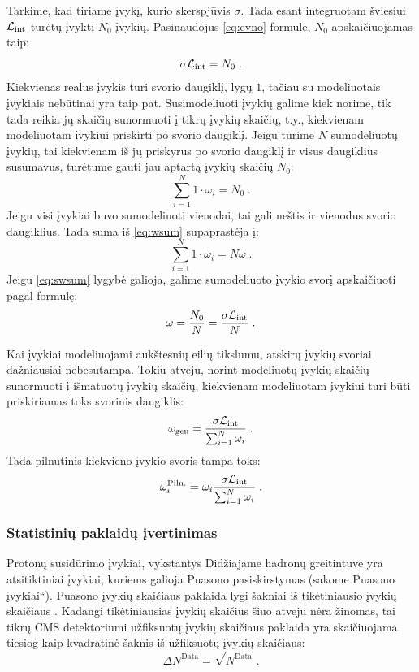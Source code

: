 \documentclass[a4paper, 12pt]{article}
\newcommand{\ltq}[1]{{\quotedblbase{}#1\textquotedblleft{}}}
\newcommand{\Lumi}{{\cal L}_\mathrm{int}}
\newlength\q
\begin{document}
Tarkime, kad tiriame įvykį, kurio skerspjūvis $\sigma$. Tada esant integruotam šviesiui $\Lumi$ turėtų įvykti $N_{0}$ įvykių. Pasinaudojus \eqref{eq:evno} formule, $N_{0}$ apskaičiuojamas taip:
\begin{equation}
\sigma \Lumi=N_{0} \; .
\label{eq:ilumi}
\end{equation}
Kiekvienas realus įvykis turi svorio daugiklį, lygų $1$, tačiau su modeliuotais įvykiais nebūtinai yra taip pat. Susimodeliuoti įvykių galime kiek norime, tik tada reikia jų skaičių sunormuoti į tikrų įvykių skaičių, t.y., kiekvienam modeliuotam įvykiui priskirti po svorio daugiklį. Jeigu turime $N$ sumodeliuotų įvykių, tai kiekvienam iš jų priskyrus po svorio daugiklį ir visus daugiklius susumavus, turėtume gauti jau aptartą įvykių skaičių $N_{0}$:
\begin{equation}
\sum_{i=1}^{N}1\cdot \omega_{i}=N_{0} \; .
\label{eq:wsum}
\end{equation}
Jeigu visi įvykiai buvo sumodeliuoti vienodai, tai gali neštis ir vienodus svorio daugiklius. Tada suma iš \eqref{eq:wsum} supaprastėja į:
\begin{equation}
\sum_{i=1}^{N}1\cdot \omega_{i}=N\omega \; .
\label{eq:swsum}
\end{equation}
Jeigu \eqref{eq:swsum} lygybė galioja, galime sumodeliuoto įvykio svorį apskaičiuoti pagal formulę:
\begin{equation}
\omega=\frac{N_{0}}{N}=\frac{\sigma \Lumi}{N} \; .
\label{eq:weight}
\end{equation}

Kai įvykiai modeliuojami aukštesnių eilių tikslumu, atskirų įvykių svoriai dažniausiai nebesutampa. Tokiu atveju, norint modeliuotų įvykių skaičių sunormuoti į išmatuotų įvykių skaičių, kiekvienam modeliuotam įvykiui  turi būti priskiriamas toks svorinis daugiklis:
\begin{equation}
\omega_{\mathrm{gen}}=\frac{\sigma\Lumi}{\sum_{i=1}^{N}\omega_{i}} \; .
\label{eq:weightnlo}
\end{equation}
Tada pilnutinis kiekvieno įvykio svoris tampa toks:
\begin{equation}
\omega_{i}^{\mathrm{Piln.}}=\omega_{i}\frac{\sigma\Lumi}{\sum_{i=1}^{N}\omega_{i}} \; .
\end{equation}

\subsubsection{Statistinių paklaidų įvertinimas}
Protonų susidūrimo įvykiai, vykstantys Didžiajame hadronų greitintuve yra atsitiktiniai įvykiai, kuriems galioja Puasono pasiskirstymas (sakome \ltq{Puasono įvykiai}). Puasono įvykių skaičiaus paklaida lygi šakniai iš tikėtiniausio įvykių skaičiaus \cite{Poisson}. Kadangi tikėtiniausias įvykių skaičius šiuo atveju nėra žinomas, tai tikrų CMS detektoriumi užfiksuotų įvykių skaičiaus paklaida yra skaičiuojama tiesiog kaip kvadratinė šaknis iš užfiksuotų įvykių skaičiaus:
\begin{equation}
\Delta N^{\mathrm{Data}} = \sqrt{N^{\mathrm{Data}}} \; .
\label{eq:poisUnc}
\end{equation}
\end{document}
